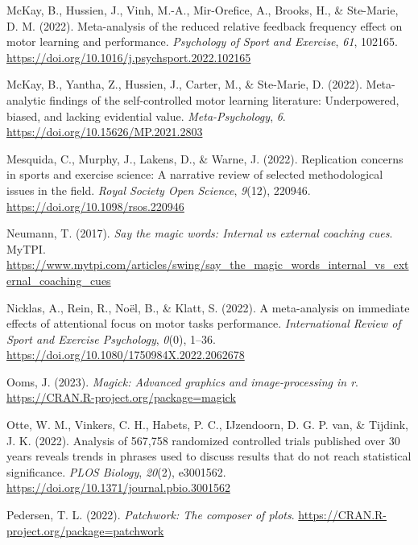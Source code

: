 \documentclass[
  11pt,
  doc, donotrepeattitle,floatsintext]{apa7}
\newlength{\cslhangindent}
\newlength{\cslentryspacingunit} %
\newenvironment{CSLReferences}[2] %
 {%
  \setlength{\parindent}{0pt}
  \ifodd #1
  \let\oldpar\par
  \def\par{\hangindent=\cslhangindent\oldpar}
  \fi
  \setlength{\parskip}{#2\cslentryspacingunit}
 }%
 {}
\begin{document}
\begin{CSLReferences}{1}{0}
\leavevmode{}%
McKay, B., Hussien, J., Vinh, M.-A., Mir-Orefice, A., Brooks, H., \& Ste-Marie, D. M. (2022). Meta-analysis of the reduced relative feedback frequency effect on motor learning and performance. \emph{Psychology of Sport and Exercise}, \emph{61}, 102165. \url{https://doi.org/10.1016/j.psychsport.2022.102165}

\leavevmode{}%
McKay, B., Yantha, Z., Hussien, J., Carter, M., \& Ste-Marie, D. (2022). Meta-analytic findings of the self-controlled motor learning literature: {Underpowered}, biased, and lacking evidential value. \emph{Meta-Psychology}, \emph{6}. \url{https://doi.org/10.15626/MP.2021.2803}

\leavevmode{}%
Mesquida, C., Murphy, J., Lakens, D., \& Warne, J. (2022). Replication concerns in sports and exercise science: A narrative review of selected methodological issues in the field. \emph{Royal Society Open Science}, \emph{9}(12), 220946. \url{https://doi.org/10.1098/rsos.220946}

\leavevmode{}%
Neumann, T. (2017). \emph{Say the magic words: {Internal} vs external coaching cues}. {MyTPI}. \url{https://www.mytpi.com/articles/swing/say_the_magic_words_internal_vs_external_coaching_cues}

\leavevmode{}%
Nicklas, A., Rein, R., Noël, B., \& Klatt, S. (2022). A meta-analysis on immediate effects of attentional focus on motor tasks performance. \emph{International Review of Sport and Exercise Psychology}, \emph{0}(0), 1--36. \url{https://doi.org/10.1080/1750984X.2022.2062678}

\leavevmode{}%
Ooms, J. (2023). \emph{Magick: Advanced graphics and image-processing in r}. \url{https://CRAN.R-project.org/package=magick}

\leavevmode{}%
Otte, W. M., Vinkers, C. H., Habets, P. C., IJzendoorn, D. G. P. van, \& Tijdink, J. K. (2022). Analysis of 567,758 randomized controlled trials published over 30 years reveals trends in phrases used to discuss results that do not reach statistical significance. \emph{PLOS Biology}, \emph{20}(2), e3001562. \url{https://doi.org/10.1371/journal.pbio.3001562}

\leavevmode{}%
Pedersen, T. L. (2022). \emph{Patchwork: The composer of plots}. \url{https://CRAN.R-project.org/package=patchwork}


\end{CSLReferences}
\end{document}
